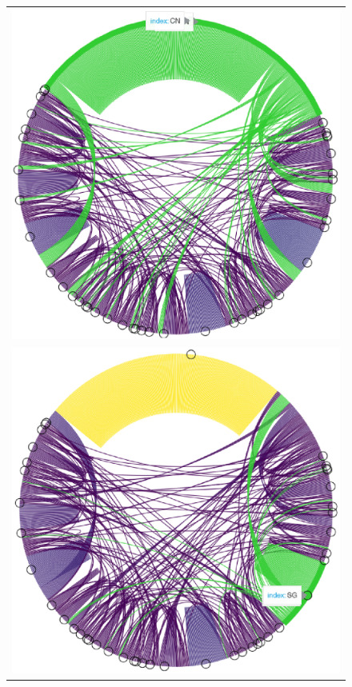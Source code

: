 \documentclass[jmse,review,accept,pdftex,moreauthors]{Definitions/mdpi}
\begin{document}
\begin{figure}[H]
\begin{tabular}{l}
\includegraphics[height=0.3\textheight, keepaspectratio]{pics/coauthorship_country_chord_1.eps}\\
	\includegraphics[height=0.3\textheight, keepaspectratio]{pics/coauthorship_country_chord_2.eps}\\

\end{tabular}
\end{figure}
\end{document}
